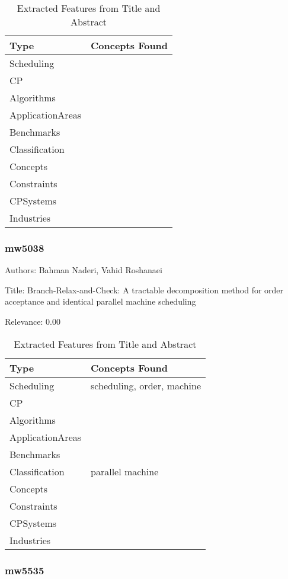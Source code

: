 {\scriptsize
\begin{longtable}{p{2cm}p{20cm}}
\caption{Extracted Features from Title and Abstract}\\ \toprule
Type & Concepts Found\\ \midrule
\endhead
\bottomrule
\endfoot
Scheduling & \\ 
CP & \\ 
Algorithms & \\ 
ApplicationAreas & \\ 
Benchmarks & \\ 
Classification & \\ 
Concepts & \\ 
Constraints & \\ 
CPSystems & \\ 
Industries & \\ 
\end{longtable}
}



\subsubsection{mw5038}
\label{mw:mw5038}

Authors: Bahman Naderi, Vahid Roshanaei

Title: Branch-Relax-and-Check: A tractable decomposition method for order acceptance and identical parallel machine scheduling

Relevance:  0.00

{\scriptsize
\begin{longtable}{p{2cm}p{20cm}}
\caption{Extracted Features from Title and Abstract}\\ \toprule
Type & Concepts Found\\ \midrule
\endhead
\bottomrule
\endfoot
Scheduling & scheduling, order, machine\\ 
CP & \\ 
Algorithms & \\ 
ApplicationAreas & \\ 
Benchmarks & \\ 
Classification & parallel machine\\ 
Concepts & \\ 
Constraints & \\ 
CPSystems & \\ 
Industries & \\ 
\end{longtable}
}



\subsubsection{mw5535}
\label{mw:mw5535}

